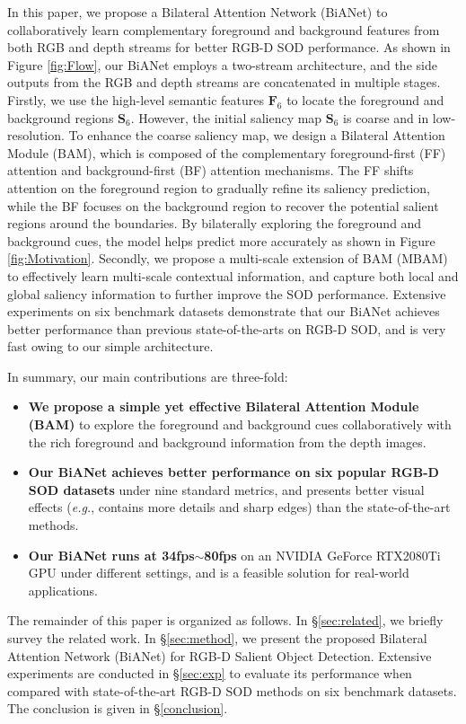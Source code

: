 \documentclass[journal]{IEEEtran}
\def\eg{\emph{e.g.}}
\newcommand{\figref}[1]{Figure \ref{#1}}
\begin{document}
In this paper, we propose a Bilateral Attention Network (BiANet) to collaboratively learn complementary foreground and background features from both RGB and depth streams for better RGB-D SOD performance.   
As shown in \figref{fig:Flow}, our BiANet employs a two-stream architecture, and the side outputs from the RGB and depth streams are concatenated in multiple stages.
Firstly, we use the high-level semantic features $\mathbf{F}_6$ to locate the foreground and background regions $\mathbf{S}_6$.
However, the initial saliency map $\mathbf{S}_6$ is coarse and in low-resolution.
To enhance the coarse saliency map, we design a Bilateral Attention Module (BAM), which is composed of the complementary foreground-first (FF) attention and background-first (BF) attention mechanisms.
The FF shifts attention on the foreground region to gradually refine its saliency prediction, while the BF focuses on the background region to recover the potential salient regions around the boundaries.
By bilaterally exploring the foreground and background cues,
the model helps predict more accurately
as shown in \figref{fig:Motivation}.
Secondly, we propose a multi-scale extension of BAM (MBAM) to effectively learn multi-scale contextual information, 
and capture both local and global saliency information to further improve the SOD performance.
Extensive experiments on six benchmark datasets demonstrate that our BiANet achieves better performance than previous state-of-the-arts on RGB-D SOD, and is very fast owing to our simple architecture.



In summary, our main contributions are three-fold:
\begin{itemize}
\item \textbf{We propose a simple yet effective Bilateral Attention Module (BAM)} to explore the foreground and background cues collaboratively with the rich foreground and background information from the depth images.\
\item \textbf{Our BiANet achieves better performance on six popular RGB-D SOD datasets} under nine standard metrics, and 
	presents better visual effects (\eg, contains more details and sharp edges) than the state-of-the-art methods.\
\item \textbf{Our BiANet runs at 34fps$\sim$80fps} on an NVIDIA GeForce RTX2080Ti GPU under different settings, and is a feasible solution for real-world applications.
\end{itemize}

The remainder of this paper is organized as follows.
In \S\ref{sec:related}, we briefly survey the related work.
In \S\ref{sec:method}, we present the proposed Bilateral Attention Network (BiANet) for RGB-D Salient Object Detection.
Extensive experiments are conducted in \S\ref{sec:exp} to evaluate its performance when compared with state-of-the-art RGB-D SOD methods on six benchmark datasets.
The conclusion is given in \S\ref{conclusion}.
\end{document}
